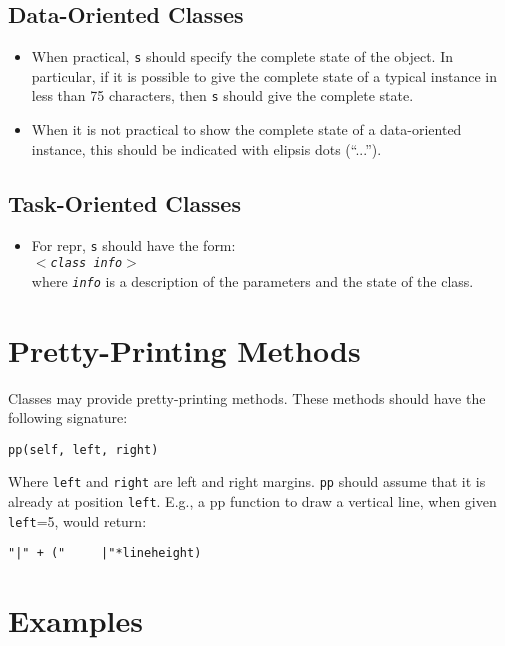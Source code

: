 \documentclass[11pt]{article}
\begin{document}
  \subsection{Data-Oriented Classes}
    \begin{itemize}
      \item When practical, \texttt{s} should specify the complete
          state of the object.  In particular, if it is possible to
          give the complete state of a typical instance in less than
          75 characters, then \texttt{s} should give the complete
          state.  
      \item When it is not practical to show the complete state
          of a data-oriented instance, this should be indicated with
          elipsis dots (``...'').
    \end{itemize}

  \subsection{Task-Oriented Classes}
    \begin{itemize}
      \item For repr, \texttt{s} should have the form:\\
        \texttt{$<$\textit{class} \textit{info}$>$}\\
        where \texttt{\textit{info}} is a description of the
        parameters and the state of the class.
    \end{itemize}


\section{Pretty-Printing Methods}

  Classes may provide pretty-printing methods.  These methods should
  have the following signature:

  \texttt{pp(self, left, right)}

  Where \texttt{left} and \texttt{right} are left and right margins.
  \texttt{pp} should assume that it is already at position
  \texttt{left}.  E.g., a pp function to draw a vertical line, when
  given \texttt{left}=5, would return:

  \texttt{"|" + ("~~~~~|"*lineheight)}


\section{Examples}
\end{document}
